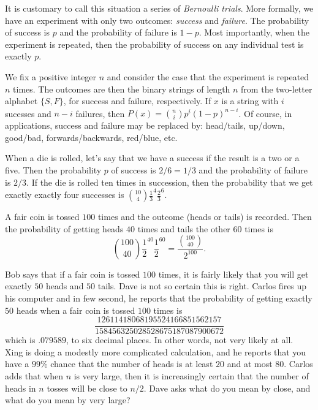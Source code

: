 It is customary to call this situation a series of \textit{Bernoulli
trials}.  More formally, we have an experiment with only two
outcomes: \textit{success} and \textit{failure}.  The probability
of success is $p$ and the probability of failure is $1-p$.  Most importantly,
when the experiment is repeated, then the probability of success on any
individual test is exactly $p$.  

We fix a positive integer $n$ and consider the case that the experiment
is repeated $n$ times.  The outcomes are then the binary strings of
length $n$ from the two-letter alphabet $\{S,F\}$, for success and failure, 
respectively.  If $x$ is a string with $i$ sucesses and $n-i$ failures, then 
$P(x)=\binom{n}{i}p ^i(1-p)^{n-i}$.  Of course, in applications, success
and failure may be replaced by: head/tails, up/down, good/bad, forwards/backwards,
red/blue, etc.

\begin{example}
When a die is rolled, let's say that we have a success if the
result is a two or a five.  Then the probability $p$ of success is
$2/6=1/3$ and the probability of failure is $2/3$.  If the die is
rolled ten times in succession, then the probability that we get exactly
exactly four successes is $\binom{10}{4}\frac{1}{3}^4
\frac{2}{3}^{6}$.
\end{example}

\begin{example}
A fair coin is tossed $100$ times and the outcome (heads or tails)
is recorded.  Then the probability of getting heads $40$ times
and tails the other $60$ times is 
\[
\binom{100}{40}\frac{1}{2}^{40}\frac{1}{2}^{60}=\frac{\binom{100}{40}}{2^{100}}.
\]
\end{example}

\begin{discussion}
Bob says that if a fair coin is tossed $100$ times, it is fairly likely
that you will get exactly $50$ heads and $50$ tails.  Dave is not so certain
this is right.  Carlos fires up his computer and in few second, he reports
that the probability of getting exactly $50$ heads when a fair coin is
tossed $100$ times is
\[
\frac{12611418068195524166851562157}{158456325028528675187087900672}
\]
which is $.079589$, to six decimal places. 
In other words, not very likely at all.  Xing is doing a modestly more complicated
calculation, and he reports that you have a $99$\% chance that the number
of heads is at least $20$ and at most $80$.  Carlos adds that when $n$ 
is very large, then it is increasingly certain that the number of heads
in $n$ tosses will be close to $n/2$.  Dave asks what do you mean by
close, and what do you mean by very large?
\end{discussion}

